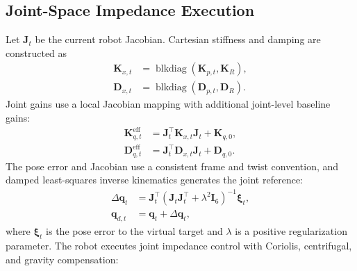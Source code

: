 \subsection{Joint-Space Impedance Execution}

Let $\mathbf{J}_t$ be the current robot Jacobian. Cartesian stiffness and damping are constructed as
\begin{equation}
\begin{aligned}
    \mathbf{K}_{x,t}
        &=\operatorname{blkdiag}(\mathbf{K}_{p,t},\mathbf{K}_R),\\
    \mathbf{D}_{x,t}
        &=\operatorname{blkdiag}(\mathbf{D}_{p,t},\mathbf{D}_R).
    \label{eq:cartesian_gains}
\end{aligned}
\end{equation}
Joint gains use a local Jacobian mapping with additional joint-level baseline gains:
\begin{equation}
\begin{aligned}
    \mathbf{K}_{q,t}^{\mathrm{eff}}
        &=\mathbf{J}_t^{\top}\mathbf{K}_{x,t}\mathbf{J}_t
          +\mathbf{K}_{q,0},\\
    \mathbf{D}_{q,t}^{\mathrm{eff}}
        &=\mathbf{J}_t^{\top}\mathbf{D}_{x,t}\mathbf{J}_t
          +\mathbf{D}_{q,0}.
    \label{eq:joint_gains}
\end{aligned}
\end{equation}
The pose error and Jacobian use a consistent frame and twist convention, and damped least-squares inverse kinematics generates the joint reference:
\begin{equation}
\begin{aligned}
    \Delta\mathbf{q}_t
        &=\mathbf{J}_t^{\top}
        \left(\mathbf{J}_t\mathbf{J}_t^{\top}
        +\lambda^2\mathbf{I}_6\right)^{-1}\boldsymbol{\xi}_t,\\
    \mathbf{q}_{d,t}&=\mathbf{q}_t+\Delta\mathbf{q}_t,
    \label{eq:damped_ik}
\end{aligned}
\end{equation}
where $\boldsymbol{\xi}_t$ is the pose error to the virtual target and $\lambda$ is a positive regularization parameter.
The robot executes joint impedance control with Coriolis, centrifugal, and gravity compensation:
